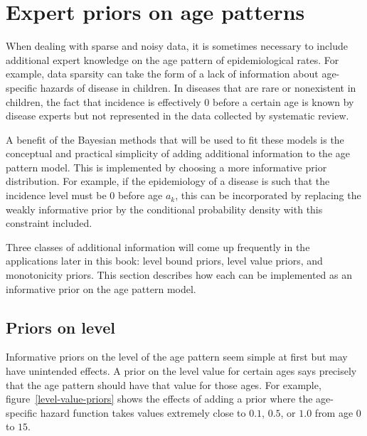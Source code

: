 \chapter{Expert priors on age patterns}
\label{theory-expert_priors}

When dealing with sparse and noisy data, it is sometimes necessary to
include additional expert knowledge on the age pattern of
epidemiological rates.  For example, data sparsity can take the form
of a lack of information about age-specific hazards of disease in children.  In
diseases that are rare or nonexistent in children, the fact that incidence is
effectively $0$ before a certain age is known by disease experts but
not represented in the data collected by systematic review.

A benefit of the Bayesian methods that will be used to fit these
models is the conceptual and practical simplicity of adding additional
information to the age pattern model.  This is implemented by choosing
a more informative prior distribution.  For example, if the
epidemiology of a disease is such that the incidence level must be
$0$ before age $a_k$, this can be incorporated by replacing the
weakly informative prior by the conditional probability density with
this constraint included.

Three classes of additional information will come up
frequently in the applications later in this book: level bound priors,
level value priors, and monotonicity priors. This section describes
how each can be implemented as an informative prior on the age pattern
model.


\section{Priors on level}

Informative priors on the level of the age pattern seem simple at
first but may have unintended effects.  A prior on the level value for
certain ages says precisely that the age pattern should have that
value for those ages.  For example, figure~\ref{level-value-priors}
shows the effects of adding a prior where the age-specific hazard function takes values extremely
close to $0.1$, $0.5$, or $1.0$ from age $0$ to $15$.

